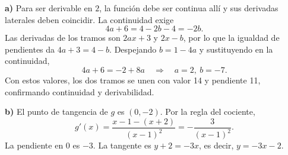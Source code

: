\textbf{a)} Para ser derivable en $2$, la función debe ser continua allí y sus derivadas laterales deben coincidir. La continuidad exige
\[
 4a+6=4-2b-4=-2b.
\]
Las derivadas de los tramos son $2ax+3$ y $2x-b$, por lo que la igualdad de pendientes da $4a+3=4-b$. Despejando $b=1-4a$ y sustituyendo en la continuidad,
\[
 4a+6=-2+8a\quad\Longrightarrow\quad
 \boxed{a=2,\ b=-7}.
\]
Con estos valores, los dos tramos se unen con valor 14 y pendiente 11, confirmando continuidad y derivabilidad.

\textbf{b)} El punto de tangencia de $g$ es $(0,-2)$. Por la regla del cociente,
\[
 g'(x)=\frac{x-1-(x+2)}{(x-1)^2}=-\frac3{(x-1)^2}.
\]
La pendiente en $0$ es $-3$. La tangente es $y+2=-3x$, es decir, $\boxed{y=-3x-2}$.

